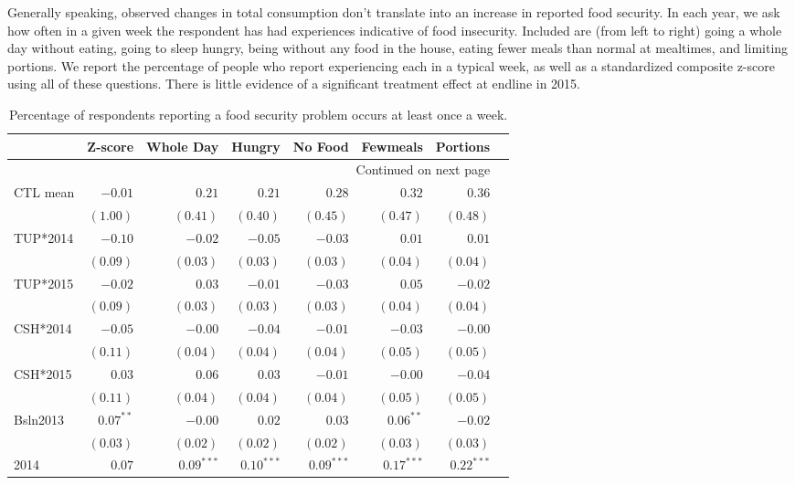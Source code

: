 \documentclass[12pt,article]{article}
\begin{document}
Generally speaking, observed changes in total consumption don't translate into an
increase in reported food security. In each year, we ask how often in a given week
the respondent has had experiences indicative of food insecurity. Included are (from
left to right) going a whole day without eating, going to sleep hungry, being without
any food in the house, eating fewer meals than normal at mealtimes, and limiting
portions. We report the percentage of people who report experiencing each in a
typical week, as well as a standardized composite z-score using all of these
questions. There is little evidence of a significant treatment effect at endline
in 2015.

\begin{longtable}{lrrrrrrr}
\caption{\label{tab:foodsecure}Percentage of respondents reporting a food security problem occurs at least once a week.}
\\
\hline
 & Z-score & Whole Day & Hungry & No Food & Fewmeals & Portions\\
\hline
\endhead
\hline\multicolumn{7}{r}{Continued on next page} \\
\endfoot
\endlastfoot
CTL mean & $-0.01$ & $0.21$ & $0.21$ & $0.28$ & $0.32$ & $0.36$\\
 & $( 1.00)$ & $( 0.41)$ & $( 0.40)$ & $( 0.45)$ & $( 0.47)$ & $( 0.48)$\\
\hline
TUP*2014 & $-0.10$ & $-0.02$ & $-0.05$ & $-0.03$ & $0.01$ & $0.01$\\
 & $( 0.09)$ & $( 0.03)$ & $( 0.03)$ & $( 0.03)$ & $( 0.04)$ & $( 0.04)$\\
TUP*2015 & $-0.02$ & $0.03$ & $-0.01$ & $-0.03$ & $0.05$ & $-0.02$\\
 & $( 0.09)$ & $( 0.03)$ & $( 0.03)$ & $( 0.03)$ & $( 0.04)$ & $( 0.04)$\\
CSH*2014 & $-0.05$ & $-0.00$ & $-0.04$ & $-0.01$ & $-0.03$ & $-0.00$\\
 & $( 0.11)$ & $( 0.04)$ & $( 0.04)$ & $( 0.04)$ & $( 0.05)$ & $( 0.05)$\\
CSH*2015 & $0.03$ & $0.06$ & $0.03$ & $-0.01$ & $-0.00$ & $-0.04$\\
 & $( 0.11)$ & $( 0.04)$ & $( 0.04)$ & $( 0.04)$ & $( 0.05)$ & $( 0.05)$\\
Bsln2013 & $0.07^{**}$ & $-0.00$ & $0.02$ & $0.03$ & $0.06^{**}$ & $-0.02$\\
 & $( 0.03)$ & $( 0.02)$ & $( 0.02)$ & $( 0.02)$ & $( 0.03)$ & $( 0.03)$\\
2014 & $0.07$ & $0.09^{***}$ & $0.10^{***}$ & $0.09^{***}$ & $0.17^{***}$ & $0.22^{***}$\\

\end{longtable}
\end{document}
